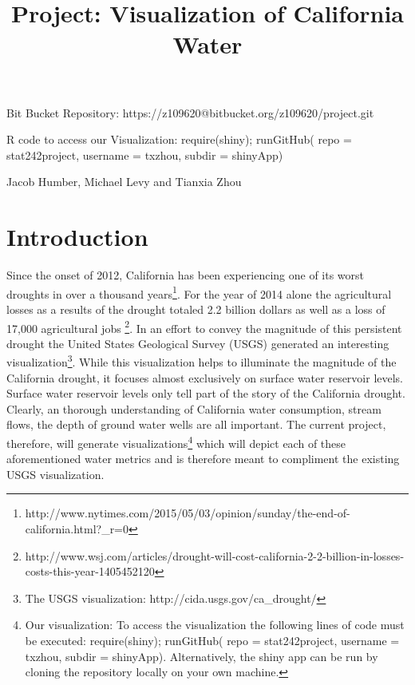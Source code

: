 \documentclass[english]{article}\usepackage[]{graphicx}\usepackage[]{color}
\begin{document}
\title{Project: Visualization of California Water}

\maketitle
\begin{center}
Bit Bucket Repository: https://z109620@bitbucket.org/z109620/project.git
\par\end{center}

\noindent \begin{center}
R code to access our Visualization: require(shiny); runGitHub( repo
= \textquotedbl{}stat242project\textquotedbl{}, username = \textquotedbl{}txzhou\textquotedbl{},
subdir = \textquotedbl{}shinyApp\textquotedbl{})
\par\end{center}

\noindent \begin{center}
Jacob Humber, Michael Levy and Tianxia Zhou
\par\end{center}


\section{Introduction}

Since the onset of 2012, California has been experiencing one of its
worst droughts in over a thousand years\footnote{http://www.nytimes.com/2015/05/03/opinion/sunday/the-end-of-california.html?\_r=0}.
For the year of 2014 alone the agricultural losses as a results of
the drought totaled 2.2 billion dollars as well as a loss of 17,000
agricultural jobs \footnote{http://www.wsj.com/articles/drought-will-cost-california-2-2-billion-in-losses-costs-this-year-1405452120}.
In an effort to convey the magnitude of this persistent drought the
United States Geological Survey (USGS) generated an interesting visualization\footnote{The USGS visualization: http://cida.usgs.gov/ca\_drought/}.
While this visualization helps to illuminate the magnitude of the
California drought, it focuses almost exclusively on surface water
reservoir levels. Surface water reservoir levels only tell part of
the story of the California drought. Clearly, an thorough understanding
of California water consumption, stream flows, the depth of ground
water wells are all important. The current project, therefore, will
generate visualizations\footnote{Our visualization: To access the visualization the following lines
of code must be executed: require(shiny); runGitHub( repo = \textquotedbl{}stat242project\textquotedbl{},
username = \textquotedbl{}txzhou\textquotedbl{}, subdir = \textquotedbl{}shinyApp\textquotedbl{}).
Alternatively, the shiny app can be run by cloning the repository
locally on your own machine.} which will depict each of these aforementioned water metrics and
is therefore meant to compliment the existing USGS visualization. 
\end{document}
